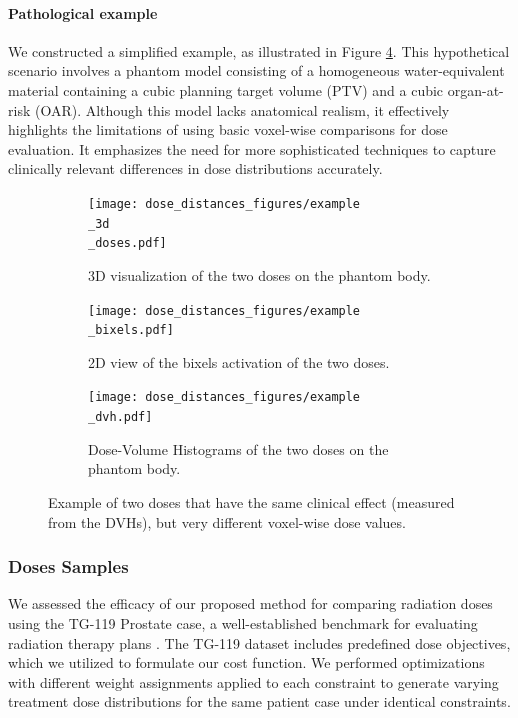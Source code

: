 \paragraph{Pathological example}
We constructed a simplified example, as illustrated in Figure \ref{fig:pathological_example}.
This hypothetical scenario involves a phantom model consisting of a homogeneous water-equivalent material containing a cubic planning target volume (PTV) and a cubic organ-at-risk (OAR).
Although this model lacks anatomical realism, it effectively highlights the limitations of using basic voxel-wise comparisons for dose evaluation.
It emphasizes the need for more sophisticated techniques to capture clinically relevant differences in dose distributions accurately.
\begin{figure}
	\centering
	\begin{subfigure}{0.44\linewidth}
		\texttt{[image: dose\_distances\_figures/example\\\_3d\\\_doses.pdf]}
		\caption{3D visualization of the two doses on the phantom body.}
		\label{fig:pathological_example-3d_doses}
	\end{subfigure}
	\begin{subfigure}{0.55\linewidth}
		\texttt{[image: dose\_distances\_figures/example\\\_bixels.pdf]}
		\caption{2D view of the bixels activation of the two doses.}
		\label{fig:pathological_example-bixels}
	\end{subfigure}
	\begin{subfigure}{0.75\linewidth}
		\texttt{[image: dose\_distances\_figures/example\\\_dvh.pdf]}
		\caption{Dose-Volume Histograms of the two doses on the phantom body.}
		\label{fig:pathological_example-dvh}
	\end{subfigure}
	\caption{Example of two doses that have the same clinical effect (measured from the DVHs), but very different voxel-wise dose values.}
	\label{fig:pathological_example}
\end{figure}

\subsubsection{Doses Samples}
We assessed the efficacy of our proposed method for comparing radiation doses using the TG-119 Prostate case, a well-established benchmark for evaluating radiation therapy plans \cite{AAPM-TG119}.
The TG-119 dataset includes predefined dose objectives, which we utilized to formulate our cost function.
We performed optimizations with different weight assignments applied to each constraint to generate varying treatment dose distributions for the same patient case under identical constraints.

